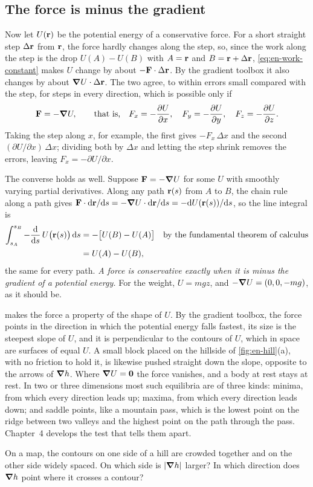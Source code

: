 \subsection*{The force is minus the gradient}

Now let $U(\bm{\mathrm{r}})$ be the potential energy of a conservative force. For
a short straight step $\Delta\bm{\mathrm{r}}$ from $\bm{\mathrm{r}}$, the force hardly
changes along the step, so, since the work along the step is the drop
$U(A) - U(B)$ with $A = \bm{\mathrm{r}}$ and $B = \bm{\mathrm{r}} + \Delta\bm{\mathrm{r}}$,
\cref{eq:en-work-constant} makes $U$ change by about $-\bm{\mathrm{F}}\cdot\Delta
\bm{\mathrm{r}}$. By the gradient toolbox it also changes by about $\bm{\nabla} U\cdot
\Delta\bm{\mathrm{r}}$. The two agree, to within errors small compared with the
step, for steps in every direction, which is possible only if
\begin{equation}
   \bm{\mathrm{F}} = -\bm{\nabla} U ,
   \qquad\text{that is,}\quad
   F_x = -\frac{\partial U}{\partial x},\quad
   F_y = -\frac{\partial U}{\partial y},\quad
   F_z = -\frac{\partial U}{\partial z} .
   \label{eq:en-gradient}
\end{equation}
Taking the step along $x$, for example, the first gives $-F_x\,\Delta x$
and the second $(\partial U/\partial x)\,\Delta x$; dividing both by
$\Delta x$ and letting the step shrink removes the errors, leaving $F_x =
-\partial U/\partial x$.

The converse holds as well. Suppose $\bm{\mathrm{F}} = -\bm{\nabla} U$ for some $U$
with smoothly varying partial derivatives. Along any path $\bm{\mathrm{r}}(s)$
from $A$ to $B$, the chain rule along a path gives $\bm{\mathrm{F}}\cdot\mathrm{d}\bm{\mathrm{r}}/
\mathrm{d} s = -\bm{\nabla} U\cdot\mathrm{d}\bm{\mathrm{r}}/\mathrm{d} s = -\mathrm{d} U(\bm{\mathrm{r}}(s))/\mathrm{d} s$, so the
line integral is
\begin{align*}
   \int_{s_A}^{s_B} -\frac{\mathrm{d}}{\mathrm{d} s}\,U\bigl(\bm{\mathrm{r}}(s)\bigr)\,\mathrm{d} s
   &= -\bigl[U(B) - U(A)\bigr]
      && \text{by the fundamental theorem of calculus}\\
   &= U(A) - U(B) ,
\end{align*}
the same for every path. \emph{A force is conservative exactly when it is
minus the gradient of a potential energy.} For the weight, $U = mgz$, and
$-\bm{\nabla} U = (0, 0, -mg)$, as it should be.

 makes the force a property of the shape of $U$. By
the gradient toolbox, the force points in the direction in which the
potential energy falls fastest, its size is the steepest slope of $U$,
and it is perpendicular to the contours of $U$, which in space are
surfaces of equal $U$. A small block placed on the hillside of
\cref{fig:en-hill}(a), with no friction to hold it, is likewise pushed
straight down the slope, opposite to the arrows of $\bm{\nabla} h$. Where $\bm{\nabla}
U = \bm{\mathrm{0}}$ the force vanishes, and a body at rest stays at rest. In two or
three dimensions most such equilibria are of three kinds: minima, from which every direction leads up; maxima, from
which every direction leads down; and saddle points, like a mountain
pass, which is the lowest point on the ridge between two valleys and the
highest point on the path through the pass. Chapter~4 develops the test
that tells them apart.

\begin{selfcheck}
On a map, the contours on one side of a hill are crowded together and on
the other side widely spaced. On which side is $\lvert\bm{\nabla} h\rvert$
larger? In which direction does $\bm{\nabla} h$ point where it crosses a
contour?
\end{selfcheck}
